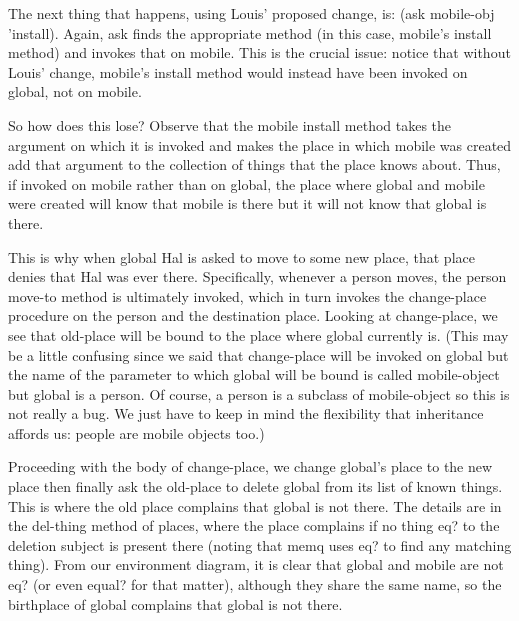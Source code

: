 The next thing that happens, using Louis' proposed change, is: {\cf (ask
mobile-obj 'install)}.  Again, {\cf ask} finds the appropriate method (in this
case, {\cf mobile}'s {\cf install} method) and invokes that on {\cf mobile}.
This is the crucial issue: notice that without Louis' change, {\cf mobile}'s
{\cf install} method would instead have been invoked on {\cf global}, not on
{\cf mobile}.

So how does this lose?  Observe that the {\cf mobile} {\cf install} method
takes the argument on which it is invoked and makes the {\cf place} in which
{\cf mobile} was created add that argument to the collection of {\cf things}
that the {\cf place} knows about.  Thus, if invoked on {\cf mobile} rather than
on {\cf global}, the place where {\cf global} and {\cf mobile} were created
will know that {\cf mobile} is there but it will not know that {\cf global} is
there.

This is why when {\cf global} Hal is asked to move to some new place, that
place denies that Hal was ever there.  Specifically, whenever a person moves,
the {\cf person} {\cf move-to} method is ultimately invoked, which in turn
invokes the {\cf change-place} procedure on the person and the destination
place.  Looking at {\cf change-place}, we see that {\cf old-place} will be
bound to the place where {\cf global} currently is.  (This may be a little
confusing since we said that {\cf change-place} will be invoked on {\cf global}
but the name of the parameter to which {\cf global} will be bound is called
{\cf mobile-object} but {\cf global} is a {\cf person}.  Of course, a {\cf
person} is a subclass of {\cf mobile-object} so this is not really a bug.  We
just have to keep in mind the flexibility that inheritance affords us: people
are mobile objects too.)

Proceeding with the body of {\cf change-place}, we change {\cf global}'s place
to the new place then finally ask the {\cf
old-place} to delete {\cf global} from its list of known things.  This is where
the old place complains that {\cf global} is not there.  The details are in the
{\cf del-thing} method of {\cf place}s, where the place complains if no thing
{\cf eq?} to the deletion subject is present there (noting that {\cf memq} uses
{\cf eq?} to find any matching thing).  From our environment diagram, it is
clear that {\cf global} and {\cf mobile} are not {\cf eq?} (or even {\cf
equal?} for that matter), although they share the same name, so the birthplace
of {\cf global} complains that {\cf global} is not there.

